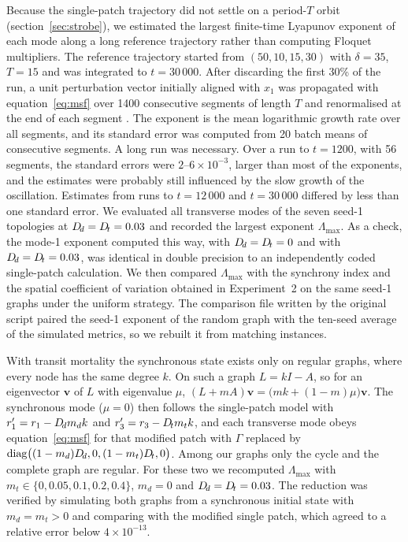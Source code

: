 Because the single-patch trajectory did not settle on a period-$T$ orbit (section~\ref{sec:strobe}), we estimated the largest finite-time Lyapunov exponent of each mode along a long reference trajectory rather than computing Floquet multipliers. The reference trajectory started from $(50,10,15,30)$ with $\delta = 35$, $T = 15$ and was integrated to $t = 30\,000$. After discarding the first 30\% of the run, a unit perturbation vector initially aligned with $x_1$ was propagated with equation~\eqref{eq:msf} over 1400 consecutive segments of length $T$ and renormalised at the end of each segment \citep{benettin1980}. The exponent is the mean logarithmic growth rate over all segments, and its standard error was computed from 20 batch means of consecutive segments. A long run was necessary. Over a run to $t = 1200$, with 56 segments, the standard errors were $2$--$6\times10^{-3}$, larger than most of the exponents, and the estimates were probably still influenced by the slow growth of the oscillation. Estimates from runs to $t = 12\,000$ and $t = 30\,000$ differed by less than one standard error. We evaluated all transverse modes of the seven seed-1 topologies at $D_{\!d} = D_{\!t} = 0.03$ and recorded the largest exponent $\Lambda_{\max}$. As a check, the mode-1 exponent computed this way, with $D_{\!d}=D_{\!t}=0$ and with $D_{\!d}=D_{\!t}=0.03$, was identical in double precision to an independently coded single-patch calculation. We then compared $\Lambda_{\max}$ with the synchrony index and the spatial coefficient of variation obtained in Experiment~2 on the same seed-1 graphs under the uniform strategy. The comparison file written by the original script paired the seed-1 exponent of the random graph with the ten-seed average of the simulated metrics, so we rebuilt it from matching instances.

With transit mortality the synchronous state exists only on regular graphs, where every node has the same degree $k$. On such a graph $L = kI - A$, so for an eigenvector $\mathbf{v}$ of $L$ with eigenvalue $\mu$, $(L + mA)\mathbf{v} = \bigl(mk + (1-m)\mu\bigr)\mathbf{v}$. The synchronous mode ($\mu = 0$) then follows the single-patch model with $r_1' = r_1 - D_{\!d} m_d k$ and $r_3' = r_3 - D_{\!t} m_t k$, and each transverse mode obeys equation~\eqref{eq:msf} for that modified patch with $\Gamma$ replaced by $\mathrm{diag}\bigl((1-m_d)D_{\!d}, 0, (1-m_t)D_{\!t}, 0\bigr)$. Among our graphs only the cycle and the complete graph are regular. For these two we recomputed $\Lambda_{\max}$ with $m_t \in \{0, 0.05, 0.1, 0.2, 0.4\}$, $m_d = 0$ and $D_{\!d} = D_{\!t} = 0.03$. The reduction was verified by simulating both graphs from a synchronous initial state with $m_d = m_t > 0$ and comparing with the modified single patch, which agreed to a relative error below $4\times10^{-13}$.

